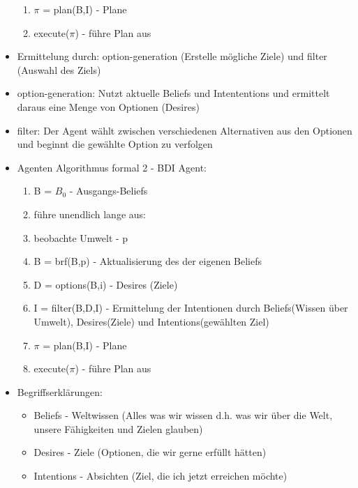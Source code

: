 \documentclass{article} %
\begin{document}
\begin{itemize}
\begin{enumerate}
			\item $\pi$ = plan(B,I) - Plane
			\item execute($\pi$) - führe Plan aus
		\end{enumerate}
		\item Ermittelung durch: option-generation (Erstelle mögliche Ziele) und filter (Auswahl des Ziels)
		\item option-generation: Nutzt aktuelle Beliefs und Intententions und ermittelt daraus eine Menge von Optionen (Desires)
		\item filter: Der Agent wählt zwischen verschiedenen Alternativen aus den Optionen und beginnt die gewählte Option zu verfolgen	
		\item Agenten Algorithmus formal 2 - BDI Agent:
		\begin{enumerate}
			\item B = $B_{0}$ - Ausgangs-Beliefs
			\item führe unendlich lange aus:
			\item beobachte Umwelt - p
			\item B = brf(B,p) - Aktualisierung des der eigenen Beliefs
			\item D = options(B,i) - Desires (Ziele)
			\item I = filter(B,D,I) - Ermittelung der Intentionen durch Beliefs(Wissen über Umwelt), Desires(Ziele) und Intentions(gewählten Ziel)
			\item $\pi$ = plan(B,I) - Plane
			\item execute($\pi$) - führe Plan aus
		\end{enumerate}
		\item Begriffserklärungen:
		\begin{itemize}
			\item Beliefs - Weltwissen (Alles was wir wissen d.h. was wir über die Welt, unsere Fähigkeiten und Zielen glauben)
			\item Desires - Ziele (Optionen, die wir gerne erfüllt hätten)
			\item Intentions - Absichten (Ziel, die ich jetzt erreichen möchte)
		\end{itemize}
	\end{itemize}
\end{document}
